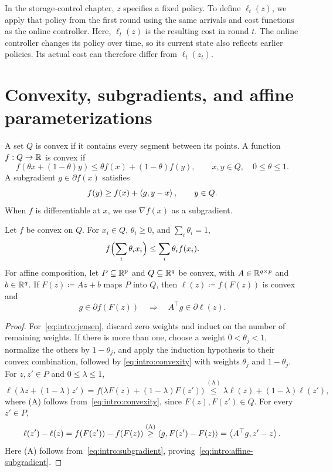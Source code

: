 In the storage-control chapter, $z$ specifies a fixed policy. To define
$\ell_t(z)$, we apply that policy from the first round using the same
arrivals and cost functions as the online controller. Here, $\ell_t(z)$ is the
resulting cost in round $t$. The online controller changes its policy
over time, so its current state also reflects earlier policies. Its
actual cost can therefore differ from $\ell_t(z_t)$.

\section{Convexity, subgradients, and affine parameterizations}
\label{sec:intro:convexity}

A set $Q$ is convex if it contains every segment between its points.
A function $f:Q\to\mathbb{R}$ is convex if
\begin{equation}\label{eq:intro:convexity}
 f(\theta x+(1-\theta)y)\le\theta f(x)+(1-\theta)f(y),
 \qquad x,y\in Q,\quad 0\le\theta\le1.
\end{equation}
A subgradient $g\in\partial f(x)$ satisfies
\begin{equation}\label{eq:intro:subgradient}
 f(y)\ge f(x)+\left\langle g,y-x \right\rangle,\qquad y\in Q.
\end{equation}
When $f$ is differentiable at $x$, we use $\nabla f(x)$ as a subgradient.

\begin{Thm:Lemma}
\label{lem:intro:convex-comparison}
Let $f$ be convex on $Q$.
For $x_i\in Q$, $\theta_i\ge0$, and $\sum_i\theta_i=1$,
\begin{equation}\label{eq:intro:jensen}
 f\Bigl(\sum_i\theta_i x_i\Bigr)\le\sum_i\theta_i f(x_i).
\end{equation}
For affine composition, let $P\subseteq\mathbb{R}^p$ and $Q\subseteq\mathbb{R}^q$
be convex, with $A\in\mathbb{R}^{q\times p}$ and $b\in\mathbb{R}^q$.
If $F(z)\coloneqq Az+b$ maps $P$ into $Q$, then $\ell(z)\coloneqq f(F(z))$ is convex and
\begin{equation}\label{eq:intro:affine-subgradient}
 g\in\partial f(F(z))\quad\Longrightarrow\quad
 A^\top g\in\partial\ell(z).
\end{equation}
\end{Thm:Lemma}
\begin{proof}
For~\eqref{eq:intro:jensen}, discard zero weights and induct on the number
of remaining weights. If there is more than one, choose a weight
$0<\theta_j<1$, normalize the others by $1-\theta_j$, and apply the
induction hypothesis to their convex combination, followed by
\eqref{eq:intro:convexity} with weights $\theta_j$ and $1-\theta_j$.
For $z,z'\in P$ and $0\le\lambda\le1$,
\[
 \ell(\lambda z+(1-\lambda)z')
 =f\bigl(\lambda F(z)+(1-\lambda)F(z')\bigr)
 \overset{\mathrm{(A)}}{\le}\lambda\ell(z)+(1-\lambda)\ell(z'),
\]
where (A) follows from~\eqref{eq:intro:convexity}, since
$F(z),F(z')\in Q$.
For every $z'\in P$,
\[
 \ell(z')-\ell(z)
 =f(F(z'))-f(F(z))
 \overset{\mathrm{(A)}}{\ge}\left\langle g,F(z')-F(z) \right\rangle
 =\left\langle A^\top g,z'-z \right\rangle.
\]
Here (A) follows from~\eqref{eq:intro:subgradient},
proving~\eqref{eq:intro:affine-subgradient}.
\end{proof}

